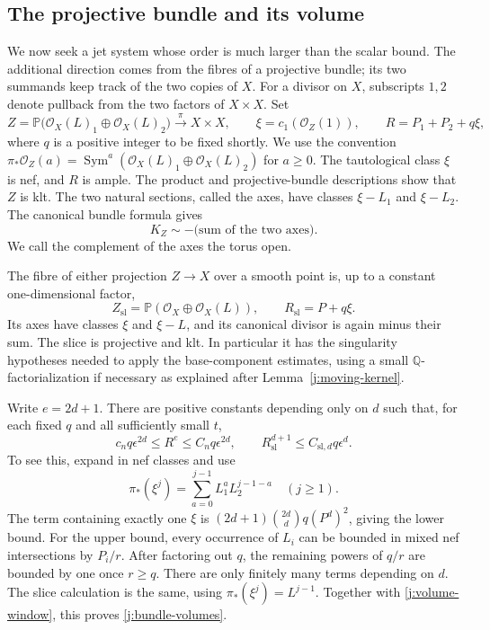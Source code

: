 \documentclass[12pt,a4paper,psamsfonts]{amsart}
\theoremstyle{definition}
\theoremstyle{plain}
\newcommand{\Q}{\mathbb Q}
\newcommand{\OO}{\mathcal O}
\newcommand{\PP}{\mathbb P}
\begin{document}
\subsection{The projective bundle and its volume}

We now seek a jet system whose order is much larger than the scalar
bound. The additional direction comes from the fibres of a
projective bundle; its two summands keep track of the two copies of
$X$. For a divisor on $X$, subscripts $1,2$ denote pullback from the
two factors of $X\times X$. Set
\begin{equation}\label{eq:bundle}
 Z=\PP\bigl(\OO_X(L)_1\oplus\OO_X(L)_2\bigr)
       \xrightarrow{\pi}X\times X,
 \qquad \xi=c_1(\OO_Z(1)),
 \qquad R=P_1+P_2+q\xi,
\end{equation}
where $q$ is a positive integer to be fixed shortly. We use the
convention
$\pi_*\OO_Z(a)=\operatorname{Sym}^a(\OO_X(L)_1\oplus\OO_X(L)_2)$
for $a\ge0$. The tautological class $\xi$ is nef, and $R$ is ample.
The product and projective-bundle descriptions show that $Z$ is klt.
The two natural sections, called the axes, have classes
$\xi-L_1$ and $\xi-L_2$. The canonical bundle formula gives
\begin{equation}\label{j:axes-canonical}
                         K_Z\sim-\text{(sum of the two axes)}.
\end{equation}
We call the complement of the axes the torus open.

The fibre of either projection $Z\to X$ over a smooth point is,
up to a constant one-dimensional factor,
\[
 Z_{\mathrm{sl}}=\PP(\OO_X\oplus\OO_X(L)),
 \qquad R_{\mathrm{sl}}=P+q\xi.
\]
Its axes have classes $\xi$ and $\xi-L$, and its canonical divisor
is again minus their sum. The slice is projective and klt. In
particular it has the singularity hypotheses needed to apply the
base-component estimates, using a small $\Q$-factorialization if
necessary as explained after Lemma~\ref{j:moving-kernel}.

Write $e=2d+1$. There are positive constants depending only on $d$
such that, for each fixed $q$ and all sufficiently small $t$,
\begin{equation}\label{j:bundle-volumes}
 c_nq\epsilon^{2d}\le R^e\le C_nq\epsilon^{2d},
 \qquad R_{\mathrm{sl}}^{d+1}\le C_{\mathrm{sl},d}q\epsilon^d.
\end{equation}
To see this, expand in nef classes and use
\[
 \pi_*(\xi^j)=\sum_{a=0}^{j-1}L_1^aL_2^{j-1-a}
 \quad(j\ge1).
\]
The term containing exactly one $\xi$ is
$(2d+1)\binom{2d}{d}q(P^d)^2$, giving the lower bound.
For the upper bound, every occurrence of $L_i$ can be bounded in
mixed nef intersections by $P_i/r$. After factoring out $q$, the
remaining powers of $q/r$ are bounded by one once $r\ge q$.
There are only finitely many terms depending on $d$. The slice
calculation is the same, using $\pi_*(\xi^j)=L^{j-1}$.
Together with \eqref{j:volume-window}, this proves
\eqref{j:bundle-volumes}.
\end{document}
